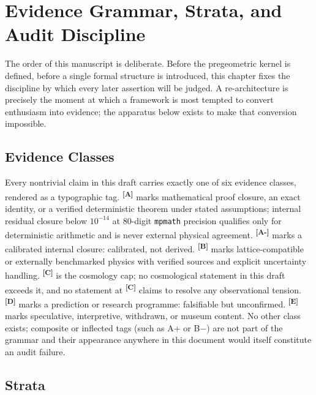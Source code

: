 \documentclass[12pt,a4paper,twoside]{article}
\theoremstyle{plain}
\theoremstyle{definition}
\theoremstyle{remark}
\newcommand{\catmark}[1]{\textsuperscript{\textsf{\textbf{[#1]}}}}
\begin{document}
\newpage

\section{Evidence Grammar, Strata, and Audit Discipline}
\label{sec:evidence-apparatus}

\noindent The order of this manuscript is deliberate. Before the
pregeometric kernel is defined, before a single formal structure is
introduced, this chapter fixes the discipline by which every later
assertion will be judged. A re-architecture is precisely the moment at
which a framework is most tempted to convert enthusiasm into evidence; the
apparatus below exists to make that conversion impossible.

\subsection{Evidence Classes}
\label{subsec:evidence-classes}

Every nontrivial claim in this draft carries exactly one of six evidence
classes, rendered as a typographic tag. \catmark{A} marks mathematical
proof closure, an exact identity, or a verified deterministic theorem
under stated assumptions; internal residual closure below $10^{-14}$ at
80-digit \texttt{mpmath} precision qualifies only for deterministic
arithmetic and is never external physical agreement. \catmark{A-} marks a
calibrated internal closure: calibrated, not derived. \catmark{B} marks
lattice-compatible or externally benchmarked physics with verified sources
and explicit uncertainty handling. \catmark{C} is the cosmology cap; no
cosmological statement in this draft exceeds it, and no statement at
\catmark{C} claims to resolve any observational tension. \catmark{D} marks
a prediction or research programme: falsifiable but unconfirmed.
\catmark{E} marks speculative, interpretive, withdrawn, or museum content.
No other class exists; composite or inflected tags (such as A+ or B$-$)
are not part of the grammar and their appearance anywhere in this document
would itself constitute an audit failure.

\subsection{Strata}
\label{subsec:strata}
\end{document}
